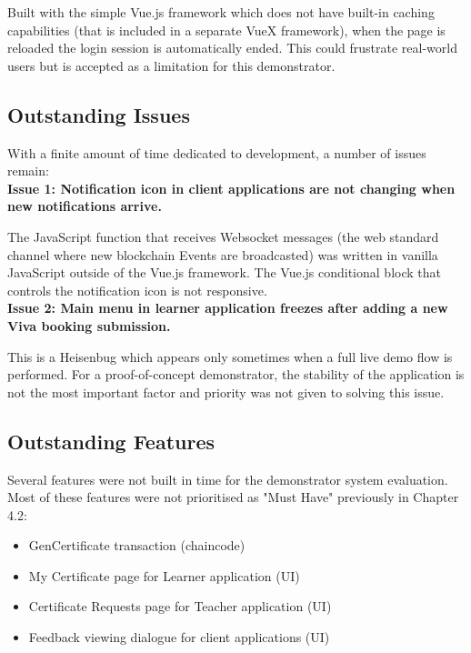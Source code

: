 Built with the simple Vue.js framework which does not have built-in caching capabilities 
(that is included in a separate VueX framework), when the page is reloaded the login session 
is automatically ended. This could frustrate real-world users but is accepted as a limitation 
for this demonstrator.

\subsection{Outstanding Issues}

With a finite amount of time dedicated to development, a number of issues remain:
\vspace{0.25cm}\\
\textbf{Issue 1: Notification icon in client applications are not changing when new notifications arrive.}

The JavaScript function that receives Websocket messages (the web standard channel where new 
blockchain Events are broadcasted) was written in vanilla JavaScript outside of the Vue.js 
framework. The Vue.js conditional block that controls the notification icon is not responsive.
\vspace{0.25cm}\\
\textbf{Issue 2: Main menu in learner application freezes after adding a new Viva booking submission.}

This is a Heisenbug which appears only sometimes when a full live demo flow is performed. 
For a proof-of-concept demonstrator, the stability of the application is not the most important factor 
and priority was not given to solving this issue.

\subsection{Outstanding Features}

Several features were not built in time for the demonstrator system evaluation.
Most of these features were not prioritised as "Must Have" previously in Chapter 4.2:

\begin{itemize}
	\setlength\itemsep{0em}	
	\item GenCertificate transaction (chaincode)
	\item My Certificate page for Learner application (UI)
	\item Certificate Requests page for Teacher application (UI)	
	\item Feedback viewing dialogue for client applications (UI)
\end{itemize}

